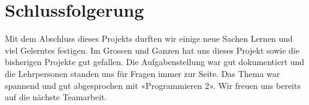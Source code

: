 \documentclass[10pt, hyperref, a4paper]{article}
\begin{document}
\section{Schlussfolgerung}
Mit dem Abschluss dieses Projekts durften wir einige neue Sachen Lernen und viel Gelerntes festigen. Im Grossen und Ganzen hat uns dieses Projekt sowie die bisherigen Projekte gut gefallen. Die Aufgabenstellung war gut dokumentiert und die Lehrpersonen standen uns für Fragen immer zur Seite. Das Thema war spannend und gut abgesprochen mit «Programmieren 2». Wir freuen uns bereits auf die nächste Teamarbeit.



\printbibliography[heading=bibnumbered,title={Literaturverzeichnis}]
\end{document}
